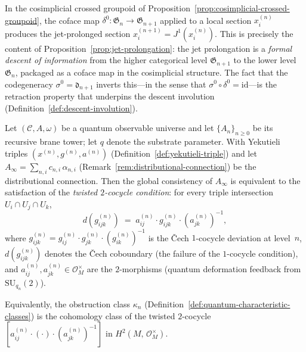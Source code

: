 \begin{remark}
\label{rem:jet-as-descent}
In the cosimplicial crossed groupoid of
Proposition~\ref{prop:cosimplicial-crossed-groupoid}, the coface map
$\delta^0 \colon \mathfrak{G}_n \to \mathfrak{G}_{n+1}$ applied to a
local section $x_i^{(n)}$ produces the jet-prolonged section
$x_i^{(n+1)} = J^1(x_i^{(n)})$.  This is precisely the content of
Proposition~\ref{prop:jet-prolongation}: the jet prolongation is a
\emph{formal descent of information} from the higher categorical level
$\mathfrak{G}_{n+1}$ to the lower level $\mathfrak{G}_n$, packaged as a
coface map in the cosimplicial structure.  The fact that the codegeneracy
$\sigma^0 = \mathfrak{d}_{n+1}$ inverts this---in the sense that
$\sigma^0 \circ \delta^0 = \mathrm{id}$---is the retraction property that
underpins the descent involution (Definition~\ref{def:descent-involution}).
\end{remark}

\begin{proposition}
\label{prop:descent-condition}
Let $(\mathcal{C}, A, \omega)$ be a quantum observable universe and let
$\{A_n\}_{n \geq 0}$ be its recursive brane tower; let $q$ denote the substrate parameter.  With Yekutieli
triples $(x^{(n)}, g^{(n)}, a^{(n)})$
(Definition~\ref{def:yekutieli-triple}) and let
$A_\infty = \sum_{n,i} c_{n,i}\, \alpha_{n,i}$
(Remark~\ref{rem:distributional-connection}) be the distributional
connection.  Then the global consistency of $A_\infty$ is equivalent to
the satisfaction of the \emph{twisted $2$-cocycle condition}: for every
triple intersection $U_i \cap U_j \cap U_k$,
\begin{equation}\label{eq:twisted-2-cocycle}
  d\!\left(g_{ijk}^{(n)}\right)
  \;=\;
  a_{ij}^{(n)} \cdot g_{ijk}^{(n)} \cdot \left(a_{jk}^{(n)}\right)^{-1},
\end{equation}
where
$g_{ijk}^{(n)} = g_{ij}^{(n)} \cdot g_{jk}^{(n)} \cdot (g_{ik}^{(n)})^{-1}$
is the \v{C}ech $1$-cocycle deviation at level~$n$,
$d(g_{ijk}^{(n)})$ denotes the \v{C}ech coboundary
(the failure of the $1$-cocycle condition), and
$a_{ij}^{(n)}, a_{jk}^{(n)} \in \mathcal{O}_M^{\times}$ are the
$2$-morphisms (quantum deformation feedback from $\mathrm{SU}_{q_n}(2)$).

Equivalently, the obstruction class $\kappa_n$
(Definition~\ref{def:quantum-characteristic-classes}) is the cohomology
class of the twisted $2$-cocycle
$[a_{ij}^{(n)} \cdot (\cdot) \cdot (a_{jk}^{(n)})^{-1}]$ in
$H^2(M,\, \mathcal{O}_M^{\times})$.
\end{proposition}

